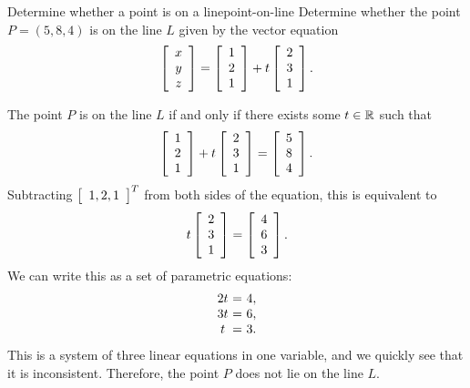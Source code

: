 \documentclass{ximera}
\begin{document}
\begin{example}{Determine whether a point is on a line}{point-on-line}
  Determine whether the point $P=(5,8,4)$ is on the line $L$ given by
  the vector equation
  \begin{equation*}
    \startmat{c} x \\ y \\ z \stopmat
    = \startmat{c} 1 \\ 2 \\ 1 \stopmat
    + t \startmat{c} 2 \\ 3 \\ 1 \stopmat.
  \end{equation*}
\end{example}

\begin{solution}
  The point $P$ is on the line $L$ if and only if there exists some
  $t\in\R$ such that
  \begin{equation*}
    \startmat{c} 1 \\ 2 \\ 1 \stopmat
    + t \startmat{c} 2 \\ 3 \\ 1 \stopmat
    = \startmat{c} 5 \\ 8 \\ 4 \stopmat.
  \end{equation*}
  Subtracting $\startmat{c}1,2,1\stopmat^T$ from both sides of the equation, this is
  equivalent to
  \begin{equation*}
    t \startmat{c} 2 \\ 3 \\ 1 \stopmat
    = \startmat{c} 4 \\ 6 \\ 3 \stopmat.
  \end{equation*}
  We can write this as a set of parametric equations:
  \begin{equation*}
    \begin{array}{c@{~}c@{~}l}
      2t &=& 4, \\
      3t &=& 6, \\
      t &=& 3.
    \end{array}
  \end{equation*}
  This is a system of three linear equations in one variable, and we
  quickly see that it is inconsistent. Therefore, the point $P$ does
  not lie on the line $L$.
\end{solution}
\end{document}
